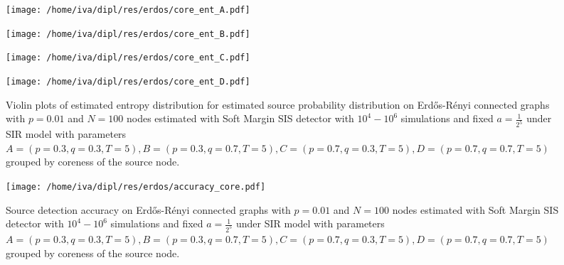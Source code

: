 \documentclass[times, utf8, diplomski]{fer}
\begin{document}
\begin{figure}[H]
\begin{minipage}{\textwidth}
\begin{minipage}{0.5\textwidth}
\texttt{[image: /home/iva/dipl/res/erdos/core\_ent\_A.pdf]}
\end{minipage}
\begin{minipage}{0.5\textwidth}
\texttt{[image: /home/iva/dipl/res/erdos/core\_ent\_B.pdf]}
\end{minipage}
\begin{minipage}{0.5\textwidth}
\texttt{[image: /home/iva/dipl/res/erdos/core\_ent\_C.pdf]}
\end{minipage}
\begin{minipage}{0.5\textwidth}
\texttt{[image: /home/iva/dipl/res/erdos/core\_ent\_D.pdf]}
\end{minipage}
\caption{Violin plots of estimated entropy distribution for estimated source probability distribution on  Erd{\H{o}}s-R{\'{e}}nyi connected graphs with $p=0.01$ and $N=100$ nodes estimated with Soft Margin SIS detector with $10^4 - 10^6$ simulations and fixed $a = \frac{1}{2^5}$ under SIR model with parameters $A = (p=0.3, q=0.3, T=5), B = (p=0.3, q=0.7, T=5), C = (p=0.7, q=0.3, T=5), D = (p=0.7, q=0.7, T=5)$ grouped by coreness of the source node.}
\label{core_ent}
\end{minipage}
\begin{minipage}{\textwidth}
\center
\texttt{[image: /home/iva/dipl/res/erdos/accuracy\_core.pdf]}
\caption{Source detection accuracy on  Erd{\H{o}}s-R{\'{e}}nyi connected graphs with $p=0.01$ and $N=100$ nodes estimated with Soft Margin SIS detector with $10^4 - 10^6$ simulations and fixed $a = \frac{1}{2^5}$ under SIR model with parameters $A = (p=0.3, q=0.3, T=5), B = (p=0.3, q=0.7, T=5), C = (p=0.7, q=0.3, T=5), D = (p=0.7, q=0.7, T=5)$ grouped by coreness of the source node.}
\label{accuracy_core}
\end{minipage}
\end{figure}
%
\end{document}
